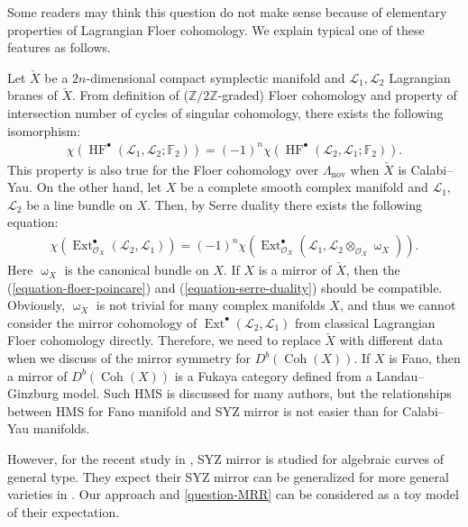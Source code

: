\documentclass[a4paper,dvipdfmx,reqno,12pt]{amsart}
\theoremstyle{definition}
\newcommand{\mcal}[1]{\mathcal{#1}}%
\newcommand{\opn}[1]{\operatorname{#1}}
\numberwithin{equation}{section}
\begin{document}
Some readers may think this question do not make sense
because of elementary properties of 
Lagrangian Floer cohomology. 
We explain typical one of these features as follows.

Let $\check{X}$ be a $2n$-dimensional 
compact symplectic manifold and 
$\mathscr{L}_1,\mathscr{L}_2$
Lagrangian branes of $\check{X}$.
From definition of ($\mathbb{Z}/2\mathbb{Z}$-graded) 
Floer cohomology and 
property of intersection number of cycles of singular 
cohomology, there exists the
following isomorphism:
\begin{align}
\label{equation-floer-poincare}
\chi (\opn{HF}^{\bullet}(\mathscr{L}_1,\mathscr{L}_2;\mathbb{F}_2))
=(-1)^{n} 
\chi(\opn{HF}^{\bullet}(\mathscr{L}_2,\mathscr{L}_1;\mathbb{F}_2)).
\end{align}
This property is also true for 
the Floer cohomology over $\Lambda_{\opn{nov}}$ when 
$\check{X}$ is Calabi--Yau.
On the other hand, let $X$ be a complete smooth 
complex manifold and $\mathcal{L}_1$, $\mathcal{L}_2$ be a
line bundle on $X$. Then, by Serre duality there exists 
the following equation:
\begin{align}
\label{equation-serre-duality}
\chi(\opn{Ext}^{\bullet}_{\mcal{O}_X}
(\mcal{L}_2,\mcal{L}_1))
= (-1)^{n}\chi(\opn{Ext}^{\bullet}_{\mcal{O}_X}
(\mcal{L}_1,\mcal{L}_2\otimes_{\mathcal{O}_X} \upomega_X)).
\end{align}
Here $\upomega_X$ is the canonical bundle on $X$.
If $X$ is a mirror of $\check{X}$, then 
the (\ref{equation-floer-poincare}) and 
(\ref{equation-serre-duality}) should be compatible.
Obviously, 
$\upomega_X$ is not trivial for many complex manifolds $X$,
and thus we cannot consider the mirror cohomology of 
$\opn{Ext}^{\bullet}(\mathcal{L}_2,\mathcal{L}_1)$
from classical Lagrangian Floer cohomology directly.
Therefore, we need to replace $\check{X}$ 
with different data when we discuss of the mirror 
symmetry for $D^{b}(\opn{Coh}(X))$. 
If $X$ is Fano, then a
mirror of $D^{b}(\opn{Coh}(X))$ is a Fukaya 
category defined from a Landau--Ginzburg model.
Such HMS is discussed for many authors, 
but the relationships between HMS for 
Fano manifold and SYZ mirror is not easier than 
for Calabi--Yau manifolds.

However, for the recent study 
in \cite{auroux2022lagrangian}, 
SYZ mirror is studied for algebraic curves 
of general type. 
They expect their SYZ mirror can be generalized for more
general varieties in \cite[{}]{auroux2022lagrangian}.
Our approach and \cref{question-MRR} can be considered as 
a toy model of their expectation. 
\end{document}
